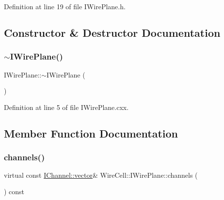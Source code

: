 Definition at line 19 of file I\+Wire\+Plane.\+h.



\subsection{Constructor \& Destructor Documentation}
\mbox{\label{class_wire_cell_1_1_i_wire_plane_af8ab9502915f7fa2e1296915617b7ea6}} 
\subsubsection{\texorpdfstring{$\sim$\+I\+Wire\+Plane()}{~IWirePlane()}}
{\footnotesize\ttfamily I\+Wire\+Plane\+::$\sim$\+I\+Wire\+Plane (\begin{DoxyParamCaption}{ }\end{DoxyParamCaption})\hspace{0.3cm}{\ttfamily [virtual]}}



Definition at line 5 of file I\+Wire\+Plane.\+cxx.



\subsection{Member Function Documentation}
\mbox{\label{class_wire_cell_1_1_i_wire_plane_ad8bbb5fc7d09e19ea546262b8162a3c0}} 
\subsubsection{\texorpdfstring{channels()}{channels()}}
{\footnotesize\ttfamily virtual const \hyperlink{class_wire_cell_1_1_i_data_ae1a9f863380499bb43f39fabb6276660}{I\+Channel\+::vector}\& Wire\+Cell\+::\+I\+Wire\+Plane\+::channels (\begin{DoxyParamCaption}{ }\end{DoxyParamCaption}) const\hspace{0.3cm}{\ttfamily [pure virtual]}}

